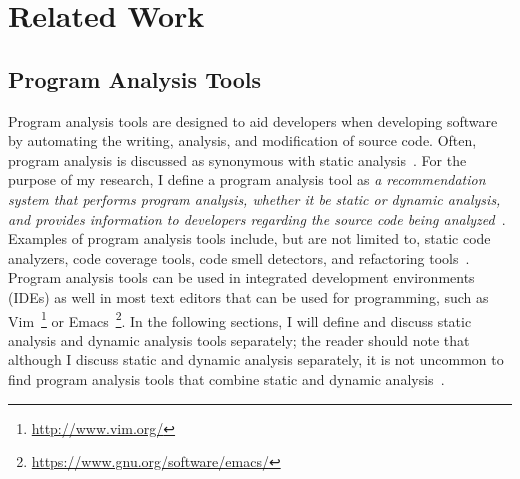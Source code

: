\chapter{Related Work}
\label{chap:related}



\section{Program Analysis Tools}
Program analysis tools are designed to aid developers when developing software by automating the writing, analysis, and modification of source code.
Often, program analysis is discussed as synonymous with static analysis~\cite{nielson2015principles}. 
For the purpose of my research, I define a program analysis tool as \emph{a recommendation system that performs program analysis, whether it be static or dynamic analysis, and provides information to developers regarding the source code being analyzed}~\cite{robillard2014recommendation}.
Examples of program analysis tools include, but are not limited to, static code analyzers, code coverage tools, code smell detectors, and refactoring tools~\cite{adolph2011using,Murphy-Hill:2010:Ambient,ge2012reconciling}.
Program analysis tools can be used in integrated development environments (IDEs) as well in most text editors that can be used for programming, such as Vim~\footnote{\url{http://www.vim.org/}} or Emacs~\footnote{\url{https://www.gnu.org/software/emacs/}}. 
In the following sections, I will define and discuss static analysis and dynamic analysis tools separately; the reader should note that although I discuss static and dynamic analysis separately, it is not uncommon to find program analysis tools that combine static and dynamic analysis~\cite{ernst2003static}.                                                

